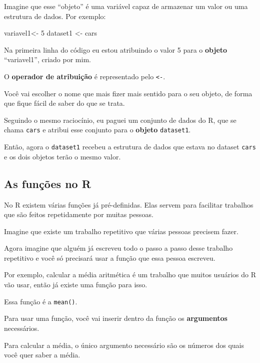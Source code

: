 \documentclass[
]{book}
\newenvironment{Shaded}{\begin{snugshade}}{\end{snugshade}}
\newcommand{\DecValTok}[1]{\textcolor[rgb]{0.00,0.00,0.81}{#1}}
\newcommand{\NormalTok}[1]{#1}
\newcommand{\StringTok}[1]{\textcolor[rgb]{0.31,0.60,0.02}{#1}}
\begin{document}
Imagine que esse ``objeto'' é uma variável capaz de armazenar um valor
ou uma estrutura de dados. Por exemplo:

\begin{Shaded}
\begin{Highlighting}[]
\NormalTok{variavel1<-}\StringTok{ }\DecValTok{5}
\NormalTok{dataset1 <-}\StringTok{ }\NormalTok{cars}
\end{Highlighting}
\end{Shaded}

Na primeira linha do código eu estou atribuindo o valor 5 para o
\textbf{objeto} ``variavel1'', criado por mim.

O \textbf{operador de atribuição} é representado pelo
\texttt{\textless{}-}.

Você vai escolher o nome que mais fizer mais sentido para o seu objeto,
de forma que fique fácil de saber do que se trata.

Seguindo o mesmo raciocínio, eu paguei um conjunto de dados do R, que se
chama \texttt{cars} e atribui esse conjunto para o \textbf{objeto}
\texttt{dataset1}.

Então, agora o \texttt{dataset1} recebeu a estrutura de dados que estava
no dataset \texttt{cars} e os dois objetos terão o mesmo valor.

\hypertarget{as-funuxe7uxf5es-no-r}{%
\subsection{As funções no R}\label{as-funuxe7uxf5es-no-r}}

No R existem várias funções já pré-definidas. Elas servem para facilitar
trabalhos que são feitos repetidamente por muitas pessoas.

Imagine que existe um trabalho repetitivo que várias pessoas precisem
fazer.

Agora imagine que alguém já escreveu todo o passo a passo desse trabalho
repetitivo e você só precisará usar a função que essa pessoa escreveu.

Por exemplo, calcular a média aritmética é um trabalho que muitos
usuários do R vão usar, então já existe uma função para isso.

Essa função é a \texttt{mean()}.

Para usar uma função, você vai inserir dentro da função os
\textbf{argumentos} necessários.

Para calcular a média, o único argumento necessário são os números dos
quais você quer saber a média.
\end{document}
